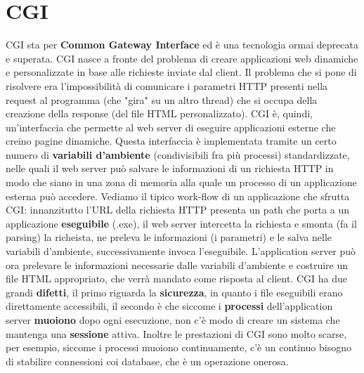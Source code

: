 \section{CGI}
CGI sta per \textbf{Common Gateway Interface} ed è una tecnologia ormai deprecata e superata.\newline
\newline
CGI nasce a fronte del problema di creare applicazioni web dinamiche e personalizzate in base alle richieste inviate dal client. Il problema che si pone di risolvere era l'impossibilità di comunicare i parametri HTTP presenti nella request al programma (che "gira" su un altro thread) che si occupa della creazione della response (del file HTML personalizzato).\newline
\newline 
CGI è, quindi, un'interfaccia che permette al web server di eseguire applicazioni esterne che creino pagine dinamiche. Questa interfaccia è implementata tramite un certo numero di \textbf{variabili d'ambiente} (condivisibili fra più processi) standardizzate, nelle quali il web server può salvare le informazioni di un richiesta HTTP in modo che siano in una zona di memoria alla quale un processo di un applicazione esterna può accedere.\newline
\newline
Vediamo il tipico work-flow di un applicazione che sfrutta CGI: innanzitutto l'URL della richiesta HTTP presenta un path che porta a un applicazione \textbf{eseguibile} (.exe), il web server intercetta la richiesta e smonta (fa il parsing) la richeista, ne preleva le informazioni (i parametri) e le salva nelle variabili d'ambiente, successivamente invoca l'eseguibile. L'application server può ora prelevare le informazioni necessarie dalle variabili d'ambiente e costruire un file HTML appropriato, che verrà mandato come risposta al client.\newline
\newline
CGI ha due grandi \textbf{difetti}, il primo riguarda la \textbf{sicurezza}, in quanto i file eseguibili erano direttamente accessibili, il secondo è che siccome i \textbf{processi} dell'application server \textbf{muoiono} dopo ogni esecuzione, non c'è modo di creare un sistema che mantenga una \textbf{sessione} attiva. Inoltre le prestazioni di CGI sono molto scarse, per esempio, siccome i processi muoiono continuamente, c'è un continuo bisogno di stabilire connessioni coi database, che è un operazione onerosa.\newline